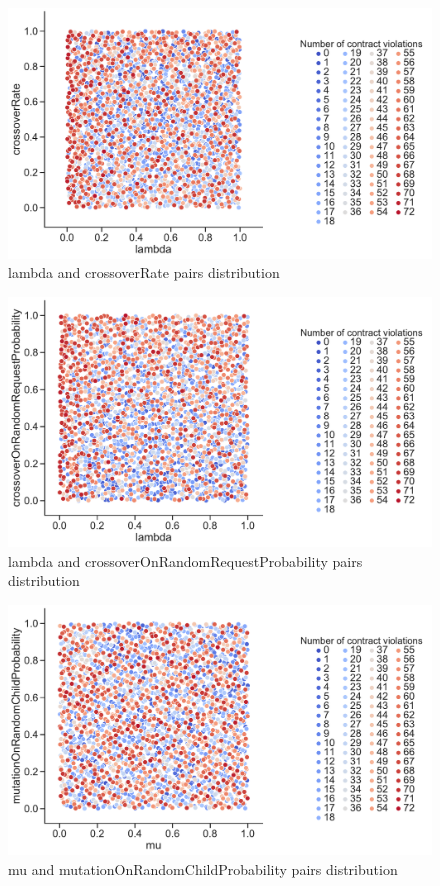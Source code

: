 \begin{figure}
	\centering
	\includegraphics[width=\textwidth]{images/PairsDistr/lambda_crossoverRate.pdf}
	\caption[]{lambda and crossoverRate pairs distribution}
	\label{fig:lambda_crossoverRate_pair}
\end{figure}

\begin{figure}
	\centering
	\includegraphics[width=\textwidth]{images/PairsDistr/lambda_crossoverOnRandomRequestProbability.pdf}
	\caption[]{lambda and crossoverOnRandomRequestProbability pairs distribution}
	\label{fig:lambda_crossoverOnRandomRequestProbability_pair}
\end{figure}

\begin{figure}
	\centering
	\includegraphics[width=\textwidth]{images/PairsDistr/mu_mutationOnRandomChildProbability.pdf}
	\caption[]{mu and mutationOnRandomChildProbability pairs distribution}
	\label{fig:mu_mutationOnRandomChildProbability_pair}
\end{figure}


